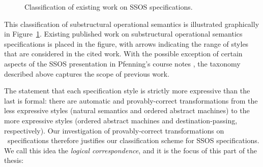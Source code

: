 \begin{figure}
\begin{center}
\end{center}
\caption{Classification of existing work on SSOS specifications.}
\label{fig:class-prevwork}
\end{figure}

This classification of substructural operational semantics is
illustrated graphically in Figure~\ref{fig:class-prevwork}. Existing
published work on substructural operational semantics specifications
is placed in the figure, with arrows indicating the range of styles
that are considered in the cited work.  With the possible exception of
certain aspects of the SSOS presentation in Pfenning's course notes
\cite{pfenning12substructural}, the taxonomy described above captures
the scope of previous work.

The statement that each specification style is strictly more
expressive than the last is formal: there are automatic and
provably-correct transformations from the less expressive styles
(natural semantics and ordered abstract machines) to the more
expressive styles (ordered abstract machines and destination-passing,
respectively).  Our investigation of provably-correct transformations
on \sls~specifications therefore justifies our classification scheme
for SSOS specifications. We call this idea the {\it logical
  correspondence}, and it is the focus of this part of the thesis:

